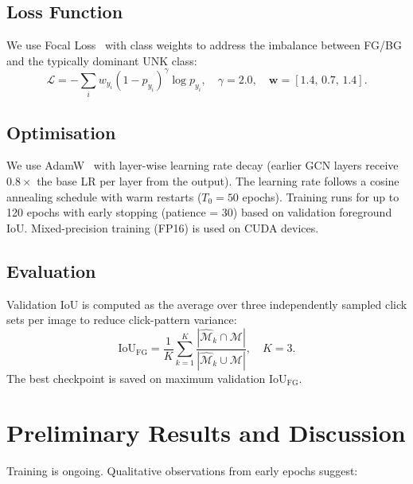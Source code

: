\documentclass[11pt]{article}
\begin{document}
\subsection{Loss Function}

We use Focal Loss~\cite{lin2017focal} with class weights to address the imbalance between
FG/BG and the typically dominant UNK class:
\begin{equation}
  \mathcal{L} = -\sum_{i} w_{y_i}(1 - p_{y_i})^\gamma \log p_{y_i},
  \quad \gamma = 2.0,
  \quad \mathbf{w} = [1.4,\, 0.7,\, 1.4].
\end{equation}

\subsection{Optimisation}

We use AdamW~\cite{loshchilov2019decoupled} with layer-wise learning rate decay
(earlier GCN layers receive $0.8\times$ the base LR per layer from the output).
The learning rate follows a cosine annealing schedule with warm restarts ($T_0 = 50$ epochs).
Training runs for up to 120 epochs with early stopping (patience = 30) based on validation
foreground IoU.
Mixed-precision training (FP16) is used on CUDA devices.

\subsection{Evaluation}

Validation IoU is computed as the average over three independently sampled click sets
per image to reduce click-pattern variance:
\begin{equation}
  \text{IoU}_{\text{FG}} = \frac{1}{K}\sum_{k=1}^{K}
  \frac{|\hat{\mathcal{M}}_k \cap \mathcal{M}|}{|\hat{\mathcal{M}}_k \cup \mathcal{M}|},
  \quad K = 3.
\end{equation}
The best checkpoint is saved on maximum validation $\text{IoU}_{\text{FG}}$.

\section{Preliminary Results and Discussion}

Training is ongoing. Qualitative observations from early epochs suggest:
\end{document}
